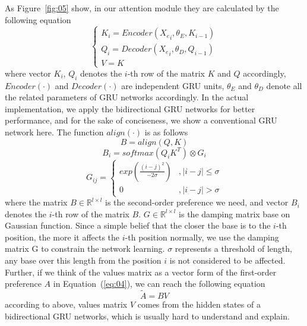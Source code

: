 \documentclass{bioinfo}
\begin{document}
As Figure~\ref{fig:05} show, in our attention module they are calculated by the following equation
\begin{equation}
\left\{\begin{array}{l}
K_i=Encoder({X_e}_i,\theta_E,K_{i-1})
\\ Q_i=Decoder({X_e}_i,\theta_D,Q_{i-1})
\\V=K 
\end{array}\right.\label{eq:14}
\end{equation}
where vector $K_i$, $Q_i$ denotes the $i$-th row of the matrix $K$ and $Q$ accordingly, $Encoder(\cdot)$ and $Decoder(\cdot)$ are independent GRU units, $\theta_E$ and $\theta_D$ denote all the related parameters of GRU networks accordingly. 
In the actual implementation, we apply the bidirectional GRU networks for better performance, and for the sake of conciseness, we show a conventional GRU network here. 
The function $align(\cdot)$ is as follows
\begin{equation}
B=align(Q,K)\label{eq:16}
\end{equation}
\begin{equation}
B_i=softmax(Q_iK^T)\otimes G_i\label{eq:17}
\end{equation}
\begin{equation}
G_{ij}=\left\{\begin{matrix}
exp(\frac{(i-j)^2}{-2\sigma})&,\left | i-j \right |\leqslant \sigma
\\ 0&,\left | i-j \right |>  \sigma
\end{matrix}\right.\label{eq:18}
\end{equation}
where the matrix $B\in\mathbb{R}^{l\times l}$ is the second-order preference we need, and vector $B_i$ denotes the $i$-th row of the matrix $B$. 
$G\in\mathbb{R}^{l\times l}$ is the damping matrix base on Gaussian function. 
Since a simple belief that the closer the base is to the $i$-th position, the more it affects the $i$-th position normally, we use the damping matrix G to constrain the network learning. 
$\sigma$ represents a threshold of length, any base over this length from the position $i$ is not considered to be affected.
Further, if we think of the values matrix as a vector form of the first-order preference $A$ in Equation~(\ref{eq:04}), we can reach the following equation
\begin{equation}
\tilde{A}=BV\label{eq:19}
\end{equation}
according to above, values matrix $V$ comes from the hidden states of a bidirectional GRU networks, which is usually hard to understand and explain.
\end{document}
